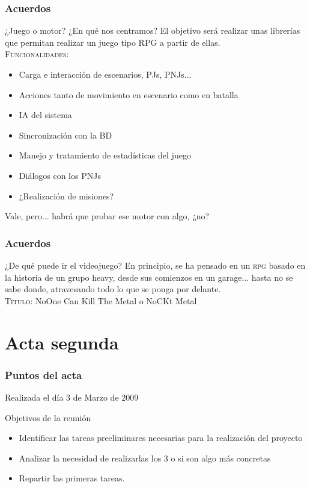 \documentclass[9pt,xcolor=svgnames]{beamer}
\begin{document}
 \begin{frame}
  \frametitle{Acuerdos}
  \transdissolve
  
  \begin{block}{¿Juego o motor? ¿En qué nos centramos?}
   El objetivo será realizar unas librerías que permitan realizar un
   juego tipo RPG a partir de ellas.\\

   \textsc{Funcionalidades}:
   \begin{itemize}
    \item Carga e interacción de escenarios, PJs, PNJs...
    \item Acciones tanto de movimiento en escenario como en batalla
    \item IA del sistema
    \item Sincronización con la BD
    \item Manejo y tratamiento de estadísticas del juego
    \item Diálogos con los PNJs
    \item ¿Realización de misiones?
   \end{itemize}
  \end{block}

  Vale, pero... habrá que probar ese motor con algo, ¿no?
 \end{frame}


 \begin{frame}
  \frametitle{Acuerdos}
  \transdissolve
  
  \begin{block}{¿De qué puede ir el videojuego?}
   En principio, se ha pensado en un \textsc{rpg} basado en la historia
   de un grupo heavy, desde sus comienzos en un garage... hasta no se
   sabe donde, atravesando todo lo que se ponga por delante.\\[1cm]

   \Large{\textsc{Título:} NoOne Can Kill The Metal o NoCKt Metal}
  \end{block}

 \end{frame}
   
 
 \section{Acta segunda}


 \begin{frame}
  \frametitle{Puntos del acta}
  \transdissolve
  
  Realizada el día 3 de Marzo de 2009

  \begin{block}{Objetivos de la reunión}
   \begin{itemize}
    \item Identificar las tareas preeliminares necesarias para la
	  realización del proyecto
    \item Analizar la necesidad de realizarlas los 3 o si son algo más
	  concretas
    \item Repartir las primeras tareas.
   \end{itemize}
  \end{block}
  
 \end{frame}
  
\end{document}
